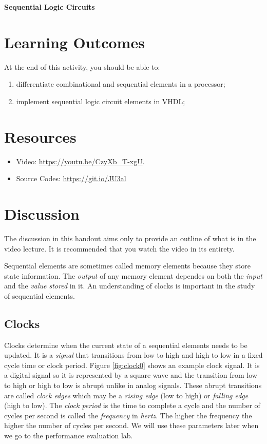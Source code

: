 \documentclass[a4paper, 11pt,oneside]{article}
\begin{document}
\begin{center}
	{\LARGE \textbf{Sequential Logic Circuits}}
\end{center}

\section*{Learning Outcomes}
   At the end of this activity, you should be able to:
   \begin{enumerate}[itemsep=0pt,parsep=0pt]
   	   \item differentiate combinational and sequential elements in a processor;
       \item implement sequential logic circuit elements in VHDL;
   \end{enumerate}   
\tableofcontents

\section{Resources}
\begin{itemize}
	\item Video: \href{https://youtu.be/CzyXb_T-xgU}{https://youtu.be/CzyXb\_T-xgU}.
	\item Source Codes: \href{https://git.io/JU3al}{https://git.io/JU3al}
\end{itemize}	


\section{Discussion}
The discussion in this handout aims only to provide an outline of what is in 
the video lecture. It is recommended that you watch the video in its entirety.

Sequential elements are sometimes called memory elements because they store 
state information. The\textit{ output} of any memory element dependes on both 
the \textit{input} and the \textit{value stored} in it. An understanding of 
clocks is important in the study of sequential elements. 

\subsection{Clocks}
Clocks determine when the current state of a sequential elements needs to be
updated. It is a \textit{signal} that transitions from low to high and high to
low in a fixed cycle time or clock period. Figure \ref{fig:clock0} shows an
example clock signal. It is a digital signal so it is represented by a square 
wave and the transition from low to high or high to low is abrupt unlike in 
analog signals. These abrupt transitions are called \textit{clock edges} which 
may be a \textit{rising edge} (low to high) or \textit{falling edge} (high to
low). The \textit{clock period} is the time to complete a cycle and the number 
of cycles per second is called the \textit{frequency} in \textit{hertz}. The 
higher the frequency the higher the number of cycles per second. We will use 
these parameters later when we go to the performance evaluation lab. 
\end{document}
